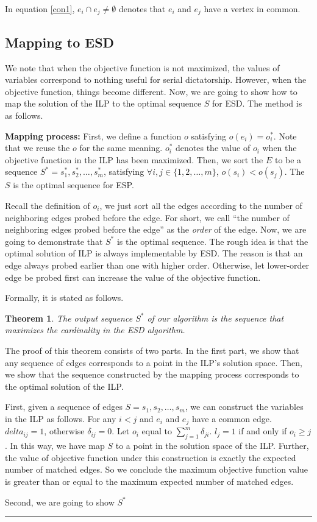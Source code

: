 \documentclass[letterpaper]{article}
\newtheorem{theorem}{Theorem}%
\newenvironment{proof}{{Proof:}}{\hfill\rule{2mm}{2mm}}
\begin{document}
In equation \ref{con1}, $e_i\cap e_j\neq \emptyset$ denotes that $e_i$ and $e_j$ have a vertex in common. 

\subsection{Mapping to ESD}
We note that when the objective function is not maximized, the values of variables correspond to nothing useful for serial dictatorship.
However, when the objective function, things become different.
Now, we are going to show how to map the solution of the ILP to the optimal sequence $S$ for ESD.
The method is as follows.

\textbf{Mapping process: }First, we define a function $o$ satisfying $o(e_i)=o_i^*$. 
Note that we reuse the $o$ for the same meaning.
$o_i^*$ denotes the value of $o_i$ when the objective function in the ILP has been maximized.
Then, we sort the $E$ to be a sequence $S^*=s_1^*,s_2^*,\ldots,s_m^*$, satisfying $\forall i,j\in\{1,2,\ldots,m\}$, $o(s_i)<o(s_j)$.
The $S$ is the optimal sequence for ESP.

Recall the definition of $o_i$, we just sort all the edges according to the number of neighboring edges probed before the edge.
For short, we call ``the number of neighboring edges probed before the edge'' as the \textit{order} of the edge.
Now, we are going to demonstrate that $S^*$ is the optimal sequence.
The rough idea is that the optimal solution of ILP is always implementable by ESD.
The reason is that an edge always probed earlier than one with higher order.
Otherwise, let lower-order edge be probed first can increase the value of the objective function.

Formally, it is stated as follows.

\begin{theorem}
	The output sequence $S^*$ of our algorithm is the sequence that maximizes the cardinality in the ESD algorithm.
\end{theorem}

\begin{proof}
	The proof of this theorem consists of two parts. In the first part, we show that any sequence of edges corresponds to a point in the ILP's solution space. 
	Then, we show that the sequence constructed by the mapping process corresponds to the optimal solution of the ILP.
	
	First, given a sequence of edges $S=s_1,s_2,\ldots,s_m$, we can construct the variables in the ILP as follows.
	For any $i<j$ and $e_i$ and $e_j$ have a common edge. $delta_{ij}=1$, otherwise $\delta_{ij}=0$.
	Let $o_i$ equal to $\sum_{j=1}^{m}\delta_{ji}$.
	$l_j=1$ if and only if $o_i\geq j$.
	In this way, we have map $S$ to a point in the solution space of the ILP.
	Further, the value of objective function under this construction is exactly the expected number of matched edges.
	So we conclude the maximum objective function value is greater than or equal to the maximum expected number of matched edges.
	
	Second, we are going to show $S^*$
\end{proof}


\newpage


\end{document}
